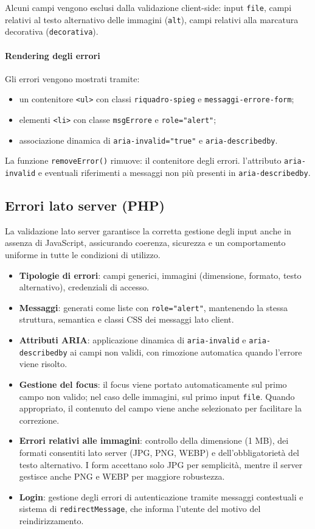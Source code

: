 \documentclass[a4paper,12pt]{article}
\begin{document}
Alcuni campi vengono esclusi dalla validazione client-side: input \texttt{file}, campi relativi al testo alternativo delle immagini (\texttt{alt}), campi relativi alla marcatura decorativa (\texttt{decorativa}).

\paragraph{Rendering degli errori}
Gli errori vengono mostrati tramite:
\begin{itemize}
    \item un contenitore \texttt{<ul>} con classi \texttt{riquadro-spieg} e \texttt{messaggi-errore-form};
    \item elementi \texttt{<li>} con classe \texttt{msgErrore} e \texttt{role="alert"};
    \item associazione dinamica di \texttt{aria-invalid="true"} e \texttt{aria-describedby}.
\end{itemize}

La funzione \texttt{removeError()} rimuove: il contenitore degli errori. l’attributo \texttt{aria-invalid} e eventuali riferimenti a messaggi non più presenti in \texttt{aria-describedby}.

\subsection{Errori lato server (PHP)}

La validazione lato server garantisce la corretta gestione degli input anche in assenza di JavaScript, assicurando coerenza, sicurezza e un comportamento uniforme in tutte le condizioni di utilizzo.

\begin{itemize}
    \item \textbf{Tipologie di errori}: campi generici, immagini (dimensione, formato, testo alternativo), credenziali di accesso.
    \item \textbf{Messaggi}: generati come liste con \texttt{role="alert"}, mantenendo la stessa struttura, semantica e classi CSS dei messaggi lato client.
    \item \textbf{Attributi ARIA}: applicazione dinamica di \texttt{aria-invalid} e \texttt{aria-describedby} ai campi non validi, con rimozione automatica quando l’errore viene risolto.
    \item \textbf{Gestione del focus}: il focus viene portato automaticamente sul primo campo non valido; nel caso delle immagini, sul primo input \texttt{file}. Quando appropriato, il contenuto del campo viene anche selezionato per facilitare la correzione.
    \item \textbf{Errori relativi alle immagini}: controllo della dimensione (1 MB), dei formati consentiti lato server (JPG, PNG, WEBP) e dell’obbligatorietà del testo alternativo. I form accettano solo JPG per semplicità, mentre il server gestisce anche PNG e WEBP per maggiore robustezza.
    \item \textbf{Login}: gestione degli errori di autenticazione tramite messaggi contestuali e sistema di \texttt{redirectMessage}, che informa l’utente del motivo del reindirizzamento.
\end{itemize}
\end{document}
